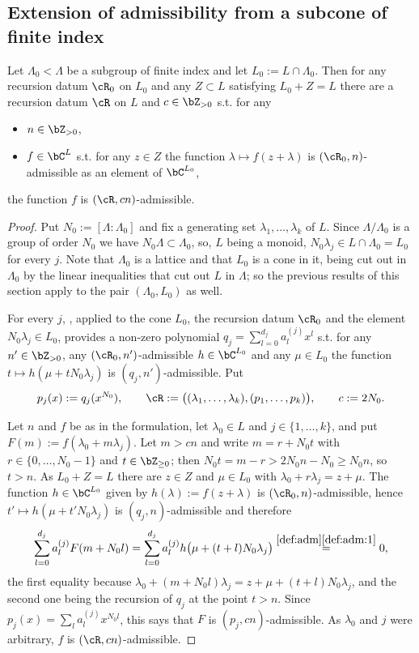 \documentclass[12pt,a4paper]{amsart}%
\newcommand{\Rami}[1]{{{#1}}}
\newcommand{\RamiB}[1]{{{#1}}}
\begin{document}
\subsection{\Rami{Extension of admissibility from a subcone of finite index}}\label{ssec:ext.adm}
\begin{lemma}\label{lem:fin.index}
    Let $\Lambda_0<\Lambda$ be a subgroup of finite index and let $L_0:=L\cap \Lambda_0$.     
    Then for any recursion datum $\cR_0$ on $L_0$ and any $Z\subset L$ satisfying 
    $L_0+Z=L$ there are a recursion datum $\cR$ on $L$ and $c\in \Z_{>0}$ s.t. for any
    \begin{itemize}
        \item $n\in \Z_{>0}$,
        \item $f\in \C^L$ s.t. for any $z\in Z$ the function $\lambda\mapsto f(z+\lambda)$ is $(\cR_0,n)$-admissible as an element of $\C^{L_0}$,
    \end{itemize}
    the function $f$ is $(\cR,cn)$-admissible.
\end{lemma}
\begin{proof}
Put $N_0:=[\Lambda:\Lambda_0]$ and fix a generating set $\lambda_1,\dots,\lambda_k$ of $L$. Since $\Lambda/\Lambda_0$ is a group of order $N_0$ we have $N_0\Lambda\subset \Lambda_0$, so, $L$ being a monoid, $N_0\lambda_j\in L\cap \Lambda_0=L_0$ for every $j$. Note that $\Lambda_0$ is a lattice and that $L_0$ is a cone in it, being cut out in $\Lambda_0$ by the linear inequalities that cut out $L$ in $\Lambda$; so the \RamiB{previous} results of this section apply to the pair $(\Lambda_0,L_0)$ as well.

For every $j$, , applied to the cone $L_0$, the recursion datum $\cR_0$ and the element $N_0\lambda_j\in L_0$, provides a non-zero polynomial $q_j=\sum_{l=0}^{d_j}a^{(j)}_lx^l$ s.t. for any $n'\in \Z_{>0}$, any $(\cR_0,n')$-admissible $h\in \C^{L_0}$ and any $\mu\in L_0$ the function $t\mapsto h(\mu+tN_0\lambda_j)$ is $(q_j,n')$-admissible. Put
$$p_j(x):=q_j(x^{N_0}),\qquad \cR:=\bigl((\lambda_1,\dots,\lambda_k),(p_1,\dots,p_k)\bigr),\qquad c:=2N_0 .$$

Let $n$ and $f$ be as in the formulation, let $\lambda_0\in L$ and $j\in\{1,\dots,k\}$, and put $F(m):=f(\lambda_0+m\lambda_j)$. Let $m>cn$ and write $m=r+N_0t$ with $r\in \{0,\dots,N_0-1\}$ and $t\in \Z_{\geq 0}$; then $N_0t=m-r>2N_0n-N_0\geq N_0n$, so $t>n$. As $L_0+Z=L$ there are $z\in Z$ and $\mu\in L_0$ with $\lambda_0+r\lambda_j=z+\mu$. The function $h\in \C^{L_0}$ given by $h(\lambda):=f(z+\lambda)$ is $(\cR_0,n)$-admissible, hence $t'\mapsto h(\mu+t'N_0\lambda_j)$ is $(q_j,n)$-admissible and therefore
$$\sum_{l=0}^{d_j}a^{(j)}_lF(m+N_0l)=\sum_{l=0}^{d_j}a^{(j)}_lh\bigl(\mu+(t+l)N_0\lambda_j\bigr)\overset{\ref{def:adm}\eqref{def:adm:1}}{=}0 ,$$
the first equality because $\lambda_0+(m+N_0l)\lambda_j=z+\mu+(t+l)N_0\lambda_j$, and the second one being the recursion of $q_j$ at the point $t>n$. Since $p_j(x)=\sum_{l}a^{(j)}_lx^{N_0l}$, this says that $F$ is $(p_j,cn)$-admissible. As $\lambda_0$ and $j$ were arbitrary, $f$ is $(\cR,cn)$-admissible.
\end{proof}
\end{document}
